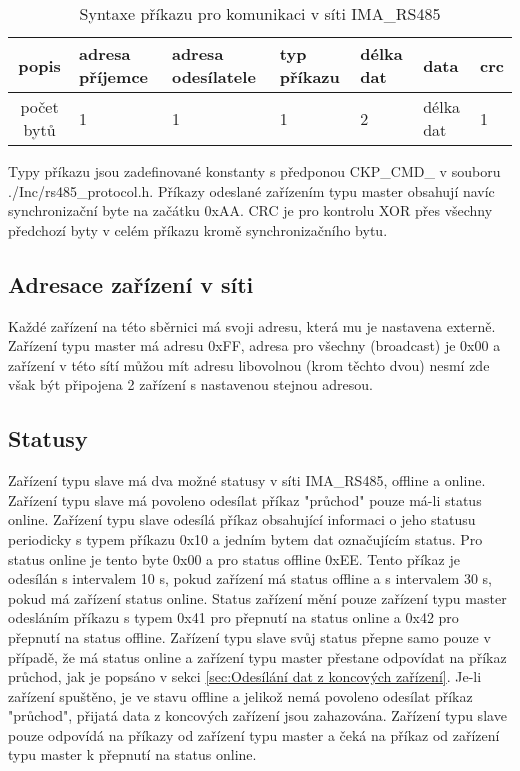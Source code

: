 \begin{table}[!h]
    \centering
\begin{tabular}{ |c|| p{1.5cm} | p{1.5cm} | p{1cm} | p{1cm} | p{1cm} | p{1cm} | }
 \hline
 popis      & adresa příjemce & adresa odesílatele & typ příkazu & délka dat & data & crc\\ \hline
 počet bytů & 1               & 1   & 1     & 2     & délka dat     & 1 \\ 
 \hline
\end{tabular}
    \caption{Syntaxe příkazu pro komunikaci v síti IMA\_RS485}
    \label{table:syntaxePrikazu}
\end{table}

Typy příkazu jsou zadefinované konstanty s předponou CKP\_CMD\_ v souboru ./Inc/rs485\_protocol.h.
Příkazy odeslané zařízením typu master obsahují navíc synchronizační byte na začátku 0xAA.
CRC je pro kontrolu XOR přes všechny předchozí byty v celém příkazu kromě synchronizačního bytu.

\subsection{Adresace zařízení v síti}
Každé zařízení na této sběrnici má svoji adresu, která mu je nastavena externě. Zařízení typu master má adresu  0xFF, adresa pro všechny (broadcast) je 0x00 a zařízení v této sítí můžou mít adresu libovolnou (krom těchto dvou) nesmí zde však být připojena 2 zařízení s nastavenou stejnou adresou.

\subsection{Statusy}
Zařízení typu slave má dva možné statusy v síti IMA\_RS485, offline a online. Zařízení typu slave má povoleno odesílat příkaz "průchod" pouze má-li status online.  
Zařízení typu slave odesílá příkaz obsahující informaci o jeho statusu periodicky s typem příkazu 0x10 a jedním bytem dat označujícím status. 
Pro status online je tento byte 0x00 a pro status offline 0xEE. 
Tento příkaz je odesílán s intervalem 10 s, pokud zařízení má status offline a s intervalem 30 s, pokud má zařízení status online.
Status zařízení mění pouze zařízení typu master odesláním příkazu s typem 0x41 pro přepnutí na status online a 0x42 pro přepnutí na status offline.
Zařízení typu slave svůj status přepne samo pouze v případě, že má status online a zařízení typu master přestane odpovídat na příkaz průchod, jak je popsáno v sekci \ref{sec:Odesílání dat z koncových zařízení}.
Je-li zařízení spuštěno, je ve stavu offline a jelikož nemá povoleno odesílat příkaz "průchod", přijatá data z koncových zařízení jsou zahazována. 
Zařízení typu slave pouze odpovídá na příkazy od zařízení typu master a čeká na příkaz od zařízení typu master k přepnutí na status online.


